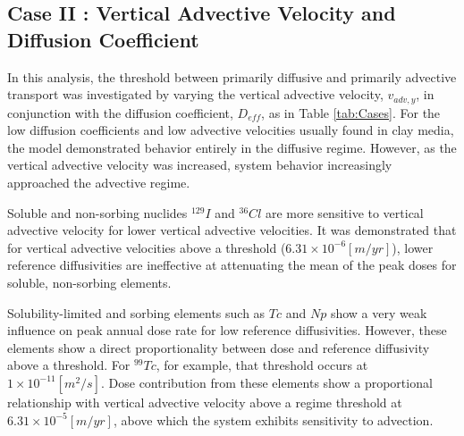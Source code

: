 \subsection{Case II : Vertical Advective Velocity and Diffusion Coefficient}

In this analysis, the threshold between primarily diffusive and primarily 
advective transport was investigated by varying the vertical advective velocity, 
$v_{adv,y}$, in conjunction with the diffusion coefficient, $D_{eff}$, as in 
Table \ref{tab:Cases}.
For the low diffusion coefficients and low advective 
velocities usually found in clay media, the model demonstrated behavior entirely 
in the diffusive regime. However, as the vertical advective velocity was 
increased, system behavior increasingly approached the advective regime. 

Soluble and non-sorbing nuclides $^{129}I$ and 
$^{36}Cl$ are more sensitive to vertical advective velocity for lower vertical 
advective velocities. It was demonstrated that for vertical advective velocities 
above a threshold ($6.31\times10^{-6}[m/yr]$), lower reference diffusivities are 
ineffective at attenuating the mean of the peak doses for soluble, non-sorbing 
elements. 

Solubility-limited and sorbing elements such as $Tc$ and $Np$ show a very weak 
influence on peak annual dose rate for low reference diffusivities. However, 
these elements show a direct proportionality between dose and reference 
diffusivity above a threshold.  For $^{99}Tc$, for example, that threshold 
occurs at $1\times10^{-11}[m^2/s]$.  Dose contribution from these elements show 
a proportional relationship with vertical advective velocity above a regime 
threshold at $6.31\times10^{-5}[m/yr]$, above which the system exhibits 
sensitivity to advection. 

